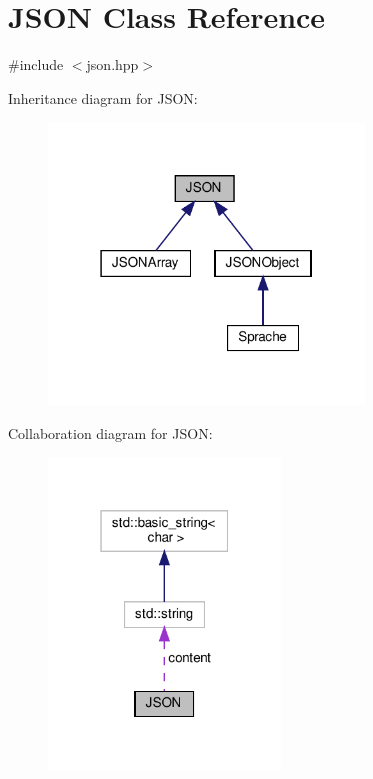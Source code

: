 \hypertarget{class_j_s_o_n}{}\section{J\+S\+ON Class Reference}
\label{class_j_s_o_n}


{\ttfamily \#include $<$json.\+hpp$>$}



Inheritance diagram for J\+S\+ON\+:
\nopagebreak
\begin{figure}[H]
\begin{center}
\leavevmode
\includegraphics[width=238pt]{class_j_s_o_n__inherit__graph}
\end{center}
\end{figure}


Collaboration diagram for J\+S\+ON\+:
\nopagebreak
\begin{figure}[H]
\begin{center}
\leavevmode
\includegraphics[width=175pt]{class_j_s_o_n__coll__graph}
\end{center}
\end{figure}
